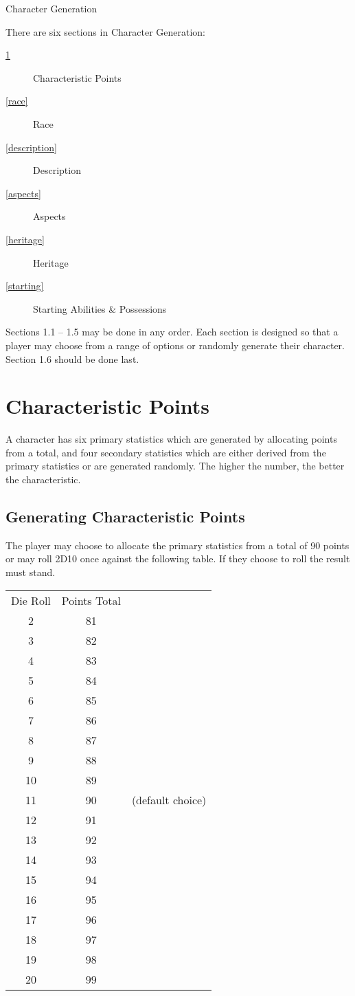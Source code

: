 \begin{Chapter}{Character Generation}

There are six sections in Character Generation: 
\begin{description}
\item[\ref{characteristic points}] Characteristic Points
\item[\ref{race}] Race
\item[\ref{description}] Description
\item[\ref{aspects}]  Aspects
\item[\ref{heritage}] Heritage
\item[\ref{starting}] Starting Abilities \& Possessions
\end{description}

Sections 1.1 -- 1.5 may be done in any order.  Each section is
designed so that a player may choose from a range of options or
randomly generate their character. Section 1.6 should be done last.

\section{Characteristic Points}
\label{characteristic points}

A character has six primary statistics which are generated by
allocating points from a total, and four secondary statistics which
are either derived from the primary statistics or are generated
randomly.  The higher the number, the better the characteristic.

\subsection{Generating Characteristic Points}

The player may choose to allocate the primary statistics from a total
of 90 points or may roll 2D10 once against the following table.  If
they choose to roll the result must stand.

\begin{tabular}{ccl}
Die Roll  & Points Total \\
2	& 81 \\
3	& 82 \\ 
4	& 83 \\
5	& 84 \\
6	& 85 \\
7	& 86 \\
8	& 87 \\
9	& 88 \\
10	& 89 \\
11	& 90 & (default choice) \\
12	& 91 \\
13	& 92 \\
14	& 93 \\
15	& 94 \\
16	& 95 \\
17	& 96 \\
18	& 97 \\
19	& 98 \\
20	& 99 \\
\end{tabular}


\end{Chapter}
